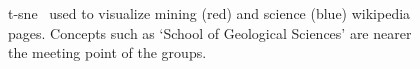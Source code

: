 \documentclass[11pt]{article}
\begin{document}
  \begin{figure}[h]
    \begin{center}
    \end{center}
    \caption{t-sne~\cite{maaten2008visualizing} used to visualize
             mining (red) and science (blue) wikipedia pages.
             Concepts such as `School of Geological Sciences' are nearer
             the meeting point of the groups.}
    \label{fig:mvs}
  \end{figure}
\end{document}
